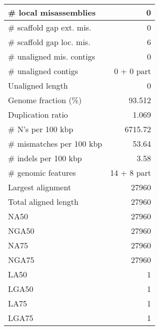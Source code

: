 \documentclass[12pt,a4paper]{article}
\begin{document}
\begin{table}[ht]
\begin{center}
\begin{tabular}{|l*{1}{|r}|}
\# local misassemblies & 0 \\ \hline
\# scaffold gap ext. mis. & 0 \\ \hline
\# scaffold gap loc. mis. & 6 \\ \hline
\# unaligned mis. contigs & 0 \\ \hline
\# unaligned contigs & 0 + 0 part \\ \hline
Unaligned length & 0 \\ \hline
Genome fraction (\%) & 93.512 \\ \hline
Duplication ratio & 1.069 \\ \hline
\# N's per 100 kbp & 6715.72 \\ \hline
\# mismatches per 100 kbp & 53.64 \\ \hline
\# indels per 100 kbp & 3.58 \\ \hline
\# genomic features & 14 + 8 part \\ \hline
Largest alignment & 27960 \\ \hline
Total aligned length & 27960 \\ \hline
NA50 & 27960 \\ \hline
NGA50 & 27960 \\ \hline
NA75 & 27960 \\ \hline
NGA75 & 27960 \\ \hline
LA50 & 1 \\ \hline
LGA50 & 1 \\ \hline
LA75 & 1 \\ \hline
LGA75 & 1 \\ \hline
\end{tabular}
\end{center}
\end{table}
\end{document}
